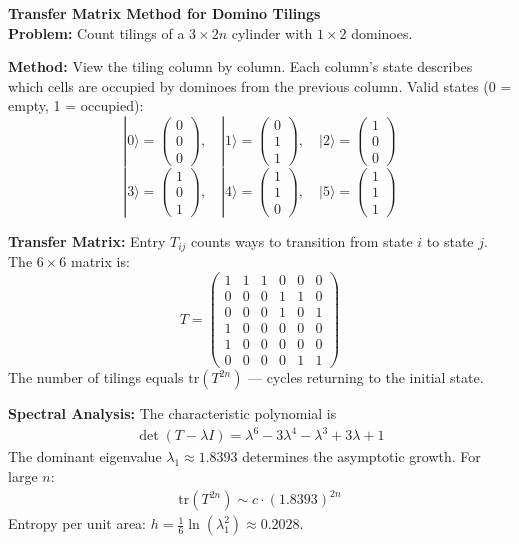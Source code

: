 \begin{technical}
{\Large\textbf{Transfer Matrix Method for Domino Tilings}}\\[0.3em]

\noindent\textbf{Problem:} Count tilings of a $3 \times 2n$ cylinder with $1 \times 2$ dominoes.

\noindent\textbf{Method:} View the tiling column by column. Each column's state describes which cells are occupied by dominoes from the previous column. Valid states (0 = empty, 1 = occupied):
\[
|0\rangle = \begin{pmatrix}0\\0\\0\end{pmatrix}, \quad
|1\rangle = \begin{pmatrix}0\\1\\1\end{pmatrix}, \quad
|2\rangle = \begin{pmatrix}1\\0\\0\end{pmatrix}
\]
\[
|3\rangle = \begin{pmatrix}1\\0\\1\end{pmatrix}, \quad
|4\rangle = \begin{pmatrix}1\\1\\0\end{pmatrix}, \quad
|5\rangle = \begin{pmatrix}1\\1\\1\end{pmatrix}
\]

\noindent\textbf{Transfer Matrix:} Entry $T_{ij}$ counts ways to transition from state $i$ to state $j$. The $6 \times 6$ matrix is:
\[
T = \begin{pmatrix}
1 & 1 & 1 & 0 & 0 & 0 \\
0 & 0 & 0 & 1 & 1 & 0 \\
0 & 0 & 0 & 1 & 0 & 1 \\
1 & 0 & 0 & 0 & 0 & 0 \\
1 & 0 & 0 & 0 & 0 & 0 \\
0 & 0 & 0 & 0 & 1 & 1
\end{pmatrix}
\]
The number of tilings equals $\text{tr}(T^{2n})$ — cycles returning to the initial state.

\noindent\textbf{Spectral Analysis:} The characteristic polynomial is
\begin{align*}
\det(T - \lambda I) = \lambda^6 - 3\lambda^4 - \lambda^3 + 3\lambda + 1
\end{align*}
The dominant eigenvalue $\lambda_1 \approx 1.8393$ determines the asymptotic growth. For large $n$:
\begin{align*}
\text{tr}(T^{2n}) \sim c \cdot (1.8393)^{2n}
\end{align*}
Entropy per unit area: $h = \frac{1}{6}\ln(\lambda_1^2) \approx 0.2028$.


\end{technical}
